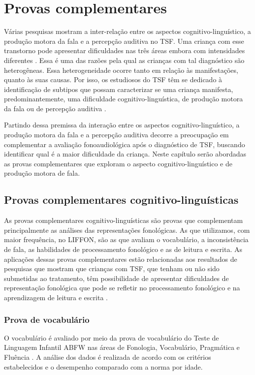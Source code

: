 \documentclass[output=paper,colorlinks,citecolor=brown,booklanguage=portuguese]{langscibook}
\begin{document}
\section{Provas complementares}\label{sec:sec3cap3}
Várias pesquisas mostram a inter-relação entre os aspectos cognitivo-linguístico, a produção motora da fala e a percepção auditiva no TSF.  Uma criança com esse transtorno pode apresentar dificuldades nas três áreas embora com intensidades diferentes \citep{Dodd2014, Dodd2018}. Essa é uma das razões pela qual as crianças com tal diagnóstico são heterogêneas. Essa heterogeneidade ocorre tanto em relação às manifestações, quanto às suas causas. Por isso, os estudiosos do TSF têm se dedicado à identificação de subtipos que possam caracterizar se uma criança manifesta, predominantemente, uma dificuldade cognitivo-linguística, de produção motora da fala ou de percepção auditiva \citep{Dodd2014, Dodd2018, Shriberg2019}. 

Partindo dessa premissa da interação entre os aspectos cognitivo-linguístico, a produção motora da fala e a percepção auditiva decorre a preocupação em complementar a avaliação fonoaudiológica após o diagnóstico de TSF, buscando identificar qual é a maior dificuldade da criança. Neste capítulo serão abordadas as provas complementares que exploram o aspecto cognitivo-linguístico e de produção motora de fala.


\subsection{Provas complementares cognitivo-linguísticas}
As provas complementares cognitivo-linguísticas são provas que complementam principalmente as análises das representações fonológicas. As que utilizamos, com maior frequência, no LIFFON, são as que avaliam o vocabulário, a inconsistência de fala, as habilidades de processamento fonológico e as de leitura e escrita. As aplicações dessas provas complementares estão relacionadas aos resultados de pesquisas que mostram que crianças com TSF, que tenham ou não sido submetidas ao tratamento, têm possibilidade de apresentar dificuldades de representação fonológica que pode se refletir no processamento fonológico e na aprendizagem de leitura e escrita \citep{Wertzner2012, Dodd2014}.


\subsubsection{Prova de vocabulário}
O vocabulário é avaliado por meio da prova de vocabulário do Teste de Linguagem Infantil ABFW nas áreas de Fonologia, Vocabulário, Pragmática e Fluência \citep{BefiLopes2004}. A análise dos dados é realizada de acordo com os critérios estabelecidos e o desempenho comparado com a norma por idade.
\end{document}
